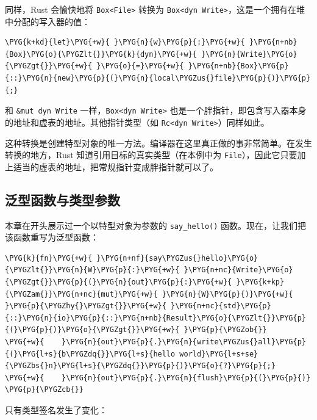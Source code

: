 同样，Rust 会愉快地将 \texttt{Box<File>} 转换为 \texttt{Box<dyn Write>}，这是一个拥有在堆中分配的写入器的值：

\begin{Verbatim}[commandchars=\\\{\},breaklines=true,breakanywhere=true,fontsize=\codefont,xleftmargin=17bp]
\PYG{k+kd}{let}\PYG{+w}{ }\PYG{n}{w}\PYG{p}{:}\PYG{+w}{ }\PYG{n+nb}{Box}\PYG{o}{\PYGZlt{}}\PYG{k}{dyn}\PYG{+w}{ }\PYG{n}{Write}\PYG{o}{\PYGZgt{}}\PYG{+w}{ }\PYG{o}{=}\PYG{+w}{ }\PYG{n+nb}{Box}\PYG{p}{::}\PYG{n}{new}\PYG{p}{(}\PYG{n}{local\PYGZus{}file}\PYG{p}{)}\PYG{p}{;}
\end{Verbatim}

和 \texttt{\&mut dyn Write} 一样，\texttt{Box<dyn Write>} 也是一个胖指针，即包含写入器本身的地址和虚表的地址。其他指针类型（如 \texttt{Rc<dyn Write>}）同样如此。

这种转换是创建特型对象的唯一方法。编译器在这里真正做的事非常简单。在发生转换的地方，Rust 知道引用目标的真实类型（在本例中为 \texttt{File}），因此它只要加上适当的虚表的地址，把常规指针变成胖指针就可以了。

\subsection{泛型函数与类型参数}

本章在开头展示过一个以特型对象为参数的 \texttt{say\_hello()} 函数。现在，让我们把该函数重写为泛型函数：

\begin{Verbatim}[commandchars=\\\{\},breaklines=true,breakanywhere=true,fontsize=\codefont,xleftmargin=17bp]
\PYG{k}{fn}\PYG{+w}{ }\PYG{n+nf}{say\PYGZus{}hello}\PYG{o}{\PYGZlt{}}\PYG{n}{W}\PYG{p}{:}\PYG{+w}{ }\PYG{n+nc}{Write}\PYG{o}{\PYGZgt{}}\PYG{p}{(}\PYG{n}{out}\PYG{p}{:}\PYG{+w}{ }\PYG{k+kp}{\PYGZam{}}\PYG{n+nc}{mut}\PYG{+w}{ }\PYG{n}{W}\PYG{p}{)}\PYG{+w}{ }\PYG{p}{\PYGZhy{}\PYGZgt{}}\PYG{+w}{ }\PYG{n+nc}{std}\PYG{p}{::}\PYG{n}{io}\PYG{p}{::}\PYG{n+nb}{Result}\PYG{o}{\PYGZlt{}}\PYG{p}{(}\PYG{p}{)}\PYG{o}{\PYGZgt{}}\PYG{+w}{ }\PYG{p}{\PYGZob{}}
\PYG{+w}{    }\PYG{n}{out}\PYG{p}{.}\PYG{n}{write\PYGZus{}all}\PYG{p}{(}\PYG{l+s}{b\PYGZdq{}}\PYG{l+s}{hello world}\PYG{l+s+se}{\PYGZbs{}n}\PYG{l+s}{\PYGZdq{}}\PYG{p}{)}\PYG{o}{?}\PYG{p}{;}
\PYG{+w}{    }\PYG{n}{out}\PYG{p}{.}\PYG{n}{flush}\PYG{p}{(}\PYG{p}{)}
\PYG{p}{\PYGZcb{}}
\end{Verbatim}

只有类型签名发生了变化：

